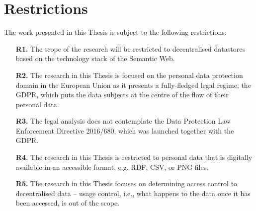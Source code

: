 \section{Restrictions}
\label{sec:restrictions}

The work presented in this Thesis is subject to the following restrictions:

\begin{enumerate}
    \item [\textbf{R1.}] The scope of the research will be restricted to decentralised datastores based on the technology stack of the Semantic Web.
    \item [\textbf{R2.}] The research in this Thesis is focused on the personal data protection domain in the European Union as it presents a fully-fledged legal regime, the GDPR, which puts the data subjects at the centre of the flow of their personal data.
    \item [\textbf{R3.}] The legal analysis does not contemplate the Data Protection Law Enforcement Directive 2016/680, which was launched together with the GDPR.
    \item [\textbf{R4.}] The research in this Thesis is restricted to personal data that is digitally available in an accessible format, e.g. RDF, CSV, or PNG files.
    \item [\textbf{R5.}] The research in this Thesis focuses on determining access control to decentralised data -- usage control, i.e., what happens to the data once it has been accessed, is out of the scope.
\end{enumerate}